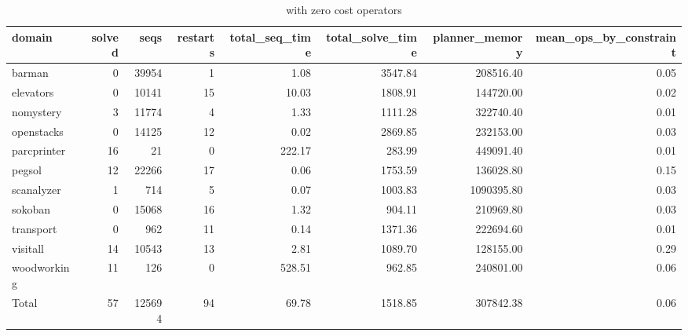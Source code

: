 \begin{table*}[htbp]
\centering
\begingroup\small
\begin{tabular}{lrrrrrrr}
  \hline
domain & solved & seqs & restarts & total\_seq\_time & total\_solve\_time & planner\_memory & mean\_ops\_by\_constraint \\ 
  \hline
barman &   0 & 39954 &   1 & 1.08 & 3547.84 & 208516.40 & 0.05 \\ 
  elevators &   0 & 10141 &  15 & 10.03 & 1808.91 & 144720.00 & 0.02 \\ 
  nomystery &   3 & 11774 &   4 & 1.33 & 1111.28 & 322740.40 & 0.01 \\ 
  openstacks &   0 & 14125 &  12 & 0.02 & 2869.85 & 232153.00 & 0.03 \\ 
  parcprinter &  16 &  21 &   0 & 222.17 & 283.99 & 449091.40 & 0.01 \\ 
  pegsol &  12 & 22266 &  17 & 0.06 & 1753.59 & 136028.80 & 0.15 \\ 
  scanalyzer &   1 & 714 &   5 & 0.07 & 1003.83 & 1090395.80 & 0.03 \\ 
  sokoban &   0 & 15068 &  16 & 1.32 & 904.11 & 210969.80 & 0.03 \\ 
  transport &   0 & 962 &  11 & 0.14 & 1371.36 & 222694.60 & 0.01 \\ 
  visitall &  14 & 10543 &  13 & 2.81 & 1089.70 & 128155.00 & 0.29 \\ 
  woodworking &  11 & 126 &   0 & 528.51 & 962.85 & 240801.00 & 0.06 \\ 
  Total &  57 & 125694 &  94 & 69.78 & 1518.85 & 307842.38 & 0.06 \\ 
   \hline
\end{tabular}
\endgroup
\caption{\oursolver{} with zero cost operators} 
\label{tab:our_with_zero}
\end{table*}
